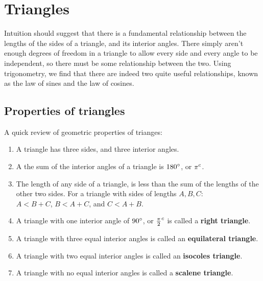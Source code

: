 \section{Triangles}

Intuition should suggest that there is a fundamental relationship between the lengths of the sides of a triangle, and its interior angles.  There simply aren't enough degrees of freedom in a triangle to allow every side and every angle to be independent, so there must be some relationship between the two.  Using trigonometry, we find that there are indeed two quite useful relationships, known as the law of sines and the law of cosines.\\

\subsection{Properties of triangles}

A quick review of geometric properties of trianges:\\

\begin{enumerate}

\item{A triangle has three sides, and three interior angles.}\\

\item{A the sum of the interior angles of a triangle is $180^\circ$, or $\pi^c$.}\\

\item{The length of any side of a triangle, is less than the sum of the lengths of the other two sides.  For a triangle with sides of lengths $A, B, C$:\\$A < B + C$, $B < A + C$, and $C < A + B$.}\\

\item{A triangle with one interior angle of $90^\circ$, or $\frac{\pi}{2}^c$ is called a {\bf right triangle}.}\\

\item{A triangle with three equal interior angles is called an {\bf equilateral triangle}.}\\

\item{A triangle with two equal interior angles is called an {\bf isocoles triangle}.}\\

\item{A triangle with no equal interior angles is called a {\bf scalene triangle}.}\\

\end{enumerate}

